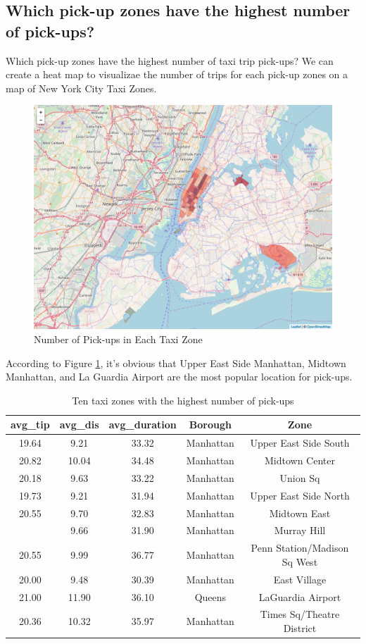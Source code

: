 \documentclass[12pt,twoside]{reedthesis}
\theoremstyle{definition}
\theoremstyle{definition}
\theoremstyle{definition}
\theoremstyle{remark}
\begin{document}
\subsection{Which pick-up zones have the highest number of
pick-ups?}\label{which-pick-up-zones-have-the-highest-number-of-pick-ups}

Which pick-up zones have the highest number of taxi trip pick-ups? We
can create a heat map to visualizae the number of trips for each pick-up
zones on a map of New York City Taxi Zones.
\begin{figure}

{\centering \includegraphics[width=4.96in]{figure/num_trip} 

}

\caption{Number of Pick-ups in Each Taxi Zone}\label{fig:num-trip}
\end{figure}
According to Figure \ref{fig:num-trip}, it's obvious that Upper East
Side Manhattan, Midtown Manhattan, and La Guardia Airport are the most
popular location for pick-ups.
\begin{table}

\caption{\label{tab:unnamed-chunk-44}Ten taxi zones with the highest number of pick-ups}
\centering
\begin{tabular}[t]{ccccc}
\toprule
avg\_tip & avg\_dis & avg\_duration & Borough & Zone\\
\midrule
19.64 & 9.21 & 33.32 & Manhattan & Upper East Side South\\
20.82 & 10.04 & 34.48 & Manhattan & Midtown Center\\
20.18 & 9.63 & 33.22 & Manhattan & Union Sq\\
19.73 & 9.21 & 31.94 & Manhattan & Upper East Side North\\
20.55 & 9.70 & 32.83 & Manhattan & Midtown East\\
\addlinespace
20.55 & 9.66 & 31.90 & Manhattan & Murray Hill\\
20.55 & 9.99 & 36.77 & Manhattan & Penn Station/Madison Sq West\\
20.00 & 9.48 & 30.39 & Manhattan & East Village\\
21.00 & 11.90 & 36.10 & Queens & LaGuardia Airport\\
20.36 & 10.32 & 35.97 & Manhattan & Times Sq/Theatre District\\
\bottomrule
\end{tabular}
\end{table}
\end{document}
